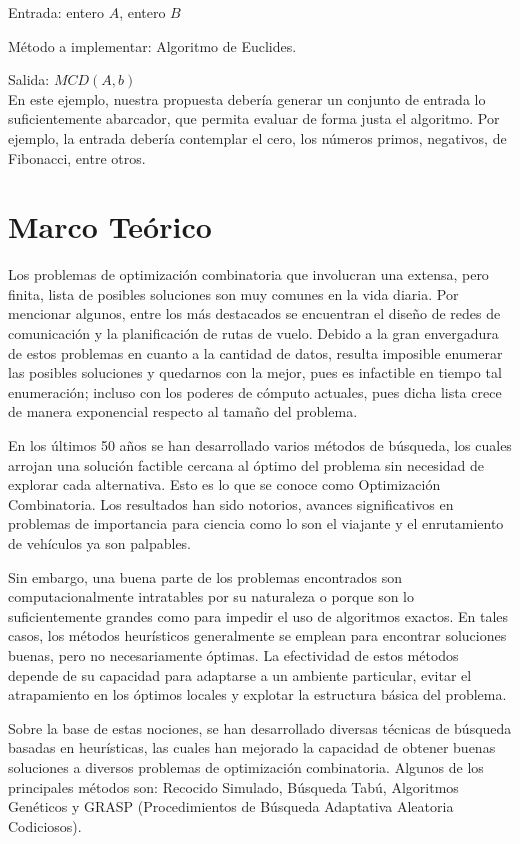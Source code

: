 \documentclass[a4paper,12pt]{book}
\begin{document}
	Entrada: entero $A$, entero $B$ 
	
	Método a implementar: Algoritmo de Euclides.
	
	Salida: $MCD(A, b)$ \\
	
	En este ejemplo, nuestra propuesta debería generar un conjunto de entrada lo suficientemente abarcador, que permita evaluar de forma justa el algoritmo. Por ejemplo, la entrada debería contemplar el cero, los números primos, negativos, de Fibonacci, entre otros.

\chapter{Marco Teórico}
	Los problemas de optimización combinatoria que involucran una extensa, pero finita, lista de posibles soluciones son muy comunes en la vida diaria. Por mencionar algunos, entre los más destacados se encuentran el diseño de redes de comunicación y la planificación de rutas de vuelo. Debido a la gran envergadura de estos problemas en cuanto a la cantidad de datos, resulta imposible enumerar las posibles soluciones y quedarnos con la mejor, pues es infactible en tiempo tal enumeración; incluso con los poderes de cómputo actuales, pues dicha lista crece de manera exponencial respecto al tamaño del problema.
	
	En los últimos 50 años se han desarrollado varios métodos de búsqueda, los cuales arrojan una solución factible cercana al óptimo del problema sin necesidad de explorar cada alternativa. Esto es lo que se conoce como Optimización Combinatoria. Los resultados han sido notorios, avances significativos en problemas de importancia para ciencia como lo son el viajante y el enrutamiento de vehículos ya son palpables.
	
	Sin embargo, una buena parte de los problemas encontrados son computacionalmente intratables por su naturaleza o porque son lo suficientemente grandes como para impedir el uso de algoritmos exactos. En tales casos, los métodos heurísticos generalmente se emplean para encontrar soluciones buenas, pero no necesariamente óptimas. La efectividad de estos métodos depende de su capacidad para adaptarse a un ambiente particular, evitar el atrapamiento en los óptimos locales y explotar la estructura básica del problema.
	
	Sobre la base de estas nociones, se han desarrollado diversas técnicas de búsqueda basadas en heurísticas, las cuales han mejorado la capacidad de obtener buenas soluciones a diversos problemas de optimización combinatoria. Algunos de los principales métodos son: Recocido Simulado, Búsqueda Tabú, Algoritmos Genéticos y GRASP (Procedimientos de Búsqueda Adaptativa Aleatoria Codiciosos).
	
\end{document}
